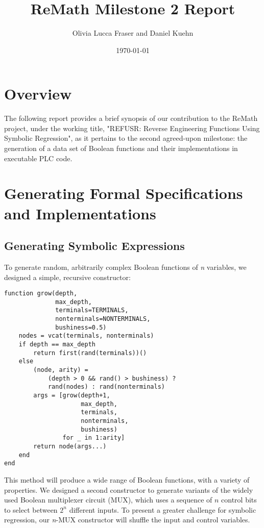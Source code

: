 \documentclass[11pt]{article}
\author{Olivia Lucca Fraser and Daniel Kuehn}
\date{\today}
\title{ReMath Milestone 2 Report}
\begin{document}
\maketitle
\tableofcontents


\section{Overview}
\label{sec:orge5b5611}

The following report provides a brief synopsis of our contribution to the ReMath project, under the working title, "REFUSR: Reverse Engineering Functions Using Symbolic Regression", as it pertains to the second agreed-upon milestone: the generation of a data set of Boolean functions and their implementations in executable PLC code. 

\section{Generating Formal Specifications and Implementations}
\label{sec:org04d912c}
\subsection{Generating Symbolic Expressions}
\label{sec:org5fca880}

To generate random, arbitrarily complex Boolean functions of \emph{n} variables, we designed a simple, recursive constructor:

\begin{verbatim}
function grow(depth,
              max_depth,
              terminals=TERMINALS,
              nonterminals=NONTERMINALS,
              bushiness=0.5)
    nodes = vcat(terminals, nonterminals)
    if depth == max_depth
        return first(rand(terminals))()
    else
        (node, arity) =
            (depth > 0 && rand() > bushiness) ?
            rand(nodes) : rand(nonterminals)
        args = [grow(depth+1,
                     max_depth,
                     terminals,
                     nonterminals,
                     bushiness)
                for _ in 1:arity]
        return node(args...)
    end
end
\end{verbatim}

This method will produce a wide range of Boolean functions, with a variety of properties. We designed a second constructor to generate variants of the widely used Boolean multiplexer circuit (MUX), which uses a sequence of \(n\) control bits to select between \(2^n\) different inputs. To present a greater challenge for symbolic regression, our \emph{n}-MUX constructor will shuffle the input and control variables.
\end{document}
